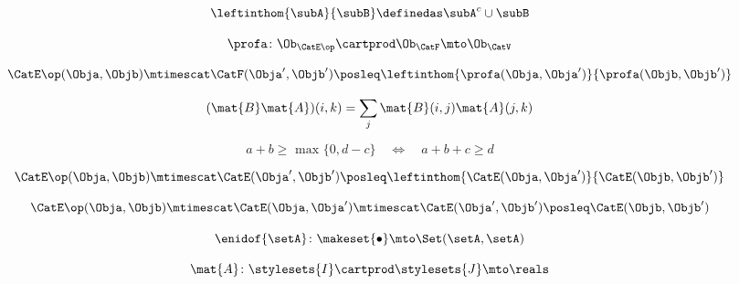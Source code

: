 {\begin{forslides}
    \begin{equation}
        \label{eq:slides_enrichment_65}
        \leftinthom{\subA}{\subB} \definedas \subA^{c} \cup \subB
    \end{equation}

    \begin{equation}
        \label{eq:slides_enrichment_66}
        \profa \colon \Ob_{\CatE\op} \cartprod \Ob_{\CatF} \mto \Ob_\CatV
    \end{equation}

    \begin{equation}
        \label{eq:slides_enrichment_67}
        \CatE\op(\Obja, \Objb) \mtimescat \CatF(\Obja', \Objb') \posleq \leftinthom{\profa(\Obja, \Obja')}{\profa(\Objb, \Objb')}
    \end{equation}

    \begin{equation}
        \label{eq:slides_enrichment_68}
        (\mat{B} \mat{A})(i, k) = \sum_{j} \mat{B}(i,j) \mat{A}(j,k)
    \end{equation}

    \begin{equation}
        \label{eq:slides_enrichment_69}
        a + b \geq \text{ max } \{ 0, d - c \} \quad \Leftrightarrow \quad a + b + c \geq d
    \end{equation}

    \begin{equation}
        \label{eq:slides_enrichment_70}
        \CatE\op(\Obja, \Objb) \mtimescat \CatE(\Obja', \Objb') \posleq \leftinthom{\CatE(\Obja, \Obja')}{\CatE(\Objb, \Objb')}
    \end{equation}

    \begin{equation}
        \label{eq:slides_enrichment_71}
        \CatE\op(\Obja, \Objb) \mtimescat \CatE(\Obja, \Obja') \mtimescat \CatE(\Obja', \Objb') \posleq \CatE(\Objb, \Objb')
    \end{equation}

    \begin{equation}
        \label{eq:slides_enrichment_72}
        \enidof{\setA} \colon \makeset{ \bullet } \mto \Set(\setA, \setA)
    \end{equation}

    \begin{equation}
        \label{eq:slides_enrichment_73}
        \mat{A} \colon \stylesets{I} \cartprod \stylesets{J} \mto \reals
    \end{equation}


\end{forslides}}
